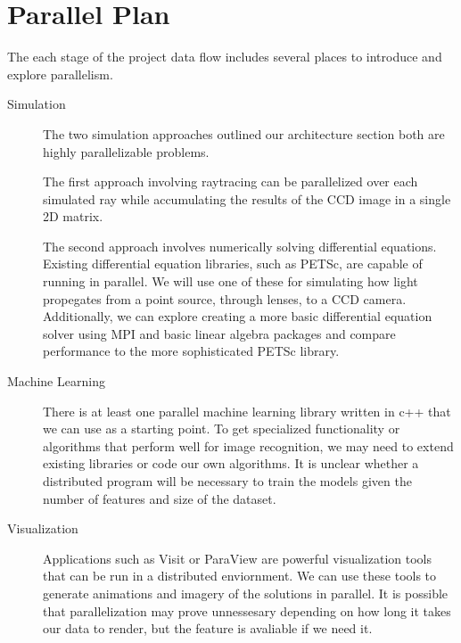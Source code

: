 \section{Parallel Plan}
The each stage of the project data flow includes several places to introduce and explore parallelism.

\begin{description}
\item[Simulation] The two simulation approaches outlined our architecture section both are highly parallelizable problems.

The first approach involving raytracing can be parallelized over each simulated ray while accumulating the results of the CCD image in a single 2D matrix.

The second approach involves numerically solving differential equations. Existing differential equation libraries, such as PETSc, are capable of running in parallel. We will use one of these for simulating how light propegates from a point source, through lenses, to a CCD camera. Additionally, we can explore creating a more basic differential equation solver using MPI and basic linear algebra packages and compare performance to the more sophisticated PETSc library.

\item[Machine Learning] There is at least one parallel machine learning library written in c++ that we can use as a starting point.  To get specialized functionality or algorithms that perform well for image recognition, we may need to extend existing libraries or code our own algorithms.  It is unclear whether a distributed program will be necessary to train the models given the number of features and size of the dataset.
\item[Visualization] Applications such as Visit or ParaView are powerful visualization tools that can be run in a distributed enviornment. We can use these tools to generate animations and imagery of the solutions in parallel. It is possible that parallelization may prove unnessesary depending on how long it takes our data to render, but the feature is avaliable if we need it.

\end{description}



